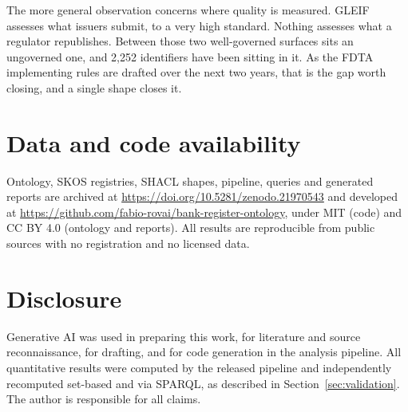 \documentclass[11pt]{article}
\begin{document}
The more general observation concerns where quality is measured. GLEIF assesses what issuers submit, to a very high standard. Nothing assesses what a regulator republishes. Between those two well-governed surfaces sits an ungoverned one, and 2,252 identifiers have been sitting in it. As the FDTA implementing rules are drafted over the next two years, that is the gap worth closing, and a single shape closes it.

\section*{Data and code availability}

Ontology, SKOS registries, SHACL shapes, pipeline, queries and generated reports are archived at \url{https://doi.org/10.5281/zenodo.21970543} and developed at \url{https://github.com/fabio-rovai/bank-register-ontology}, under MIT (code) and CC BY 4.0 (ontology and reports). All results are reproducible from public sources with no registration and no licensed data.

\section*{Disclosure}

Generative AI was used in preparing this work, for literature and source reconnaissance, for drafting, and for code generation in the analysis pipeline. All quantitative results were computed by the released pipeline and independently recomputed set-based and via SPARQL, as described in Section~\ref{sec:validation}. The author is responsible for all claims.
\end{document}
